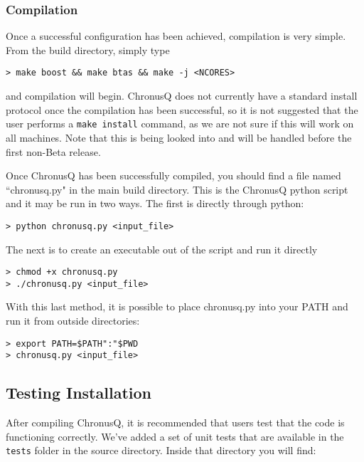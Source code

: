 \documentclass[12pt]{article}
\begin{document}
    \subsubsection{Compilation} \label{subsubsec:ChronusQCompile}
    
    Once a successful configuration has been achieved, compilation is very simple.
    From the build directory, simply type

    \begin{lstlisting}
> make boost && make btas && make -j <NCORES>
    \end{lstlisting}

    \noindent and compilation will begin. ChronusQ does not currently have a 
    standard install protocol once the compilation has been successful, so it is
    not suggested that the user performs a \texttt{make install} command, as we are 
    not sure if this will work on all machines. Note that this is being looked into 
    and will be handled before the first non-Beta release.

    Once ChronusQ has been successfully compiled, you should find a file
    named ``chronusq.py" in the main build directory. This is the ChronusQ python
    script and it may be run in two ways. The first is directly through python:

    \begin{lstlisting}
> python chronusq.py <input_file>
    \end{lstlisting}

    \noindent The next is to create an executable out of the script and run it
    directly

    \begin{lstlisting}
> chmod +x chronusq.py
> ./chronusq.py <input_file>
    \end{lstlisting}

    \noindent With this last method, it is possible to place chronusq.py into your
    PATH and run it from outside directories:

    \begin{lstlisting}
> export PATH=$PATH":"$PWD
> chronusq.py <input_file>
    \end{lstlisting}

    \subsection{Testing Installation} \label{subsec:ChronusQTest}

    After compiling ChronusQ, it is recommended that users test that
    the code is functioning correctly. We've added a set of unit tests that are 
    available in the \texttt{tests} folder in the source directory. Inside that 
    directory you will find:
    
\end{document}

